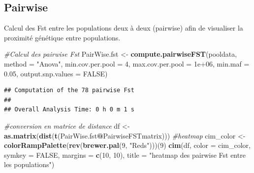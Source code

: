 \documentclass[
  openany]{book}
\newenvironment{Shaded}{\begin{snugshade}}{\end{snugshade}}
\newcommand{\AttributeTok}[1]{\textcolor[rgb]{0.13,0.29,0.53}{#1}}
\newcommand{\CommentTok}[1]{\textcolor[rgb]{0.56,0.35,0.01}{\textit{#1}}}
\newcommand{\ConstantTok}[1]{\textcolor[rgb]{0.56,0.35,0.01}{#1}}
\newcommand{\DecValTok}[1]{\textcolor[rgb]{0.00,0.00,0.81}{#1}}
\newcommand{\FloatTok}[1]{\textcolor[rgb]{0.00,0.00,0.81}{#1}}
\newcommand{\FunctionTok}[1]{\textcolor[rgb]{0.13,0.29,0.53}{\textbf{#1}}}
\newcommand{\NormalTok}[1]{#1}
\newcommand{\OtherTok}[1]{\textcolor[rgb]{0.56,0.35,0.01}{#1}}
\newcommand{\SpecialCharTok}[1]{\textcolor[rgb]{0.81,0.36,0.00}{\textbf{#1}}}
\newcommand{\StringTok}[1]{\textcolor[rgb]{0.31,0.60,0.02}{#1}}
\theoremstyle{definition}
\theoremstyle{definition}
\theoremstyle{definition}
\theoremstyle{definition}
\theoremstyle{remark}
\begin{document}
\hypertarget{pairwise}{%
\subsection*{Pairwise}\label{pairwise}}

Calcul des Fst entre les populations deux à deux (pairwise) afin de visualiser la proximité génétique entre populations.

\begin{Shaded}
\begin{Highlighting}[]
\CommentTok{\#Calcul des pairwise Fst }
\NormalTok{PairWise.fst }\OtherTok{\textless{}{-}} \FunctionTok{compute.pairwiseFST}\NormalTok{(pooldata, }\AttributeTok{method =} \StringTok{"Anova"}\NormalTok{, }\AttributeTok{min.cov.per.pool =} \DecValTok{4}\NormalTok{, }\AttributeTok{max.cov.per.pool =} \FloatTok{1e+06}\NormalTok{, }\AttributeTok{min.maf =} \FloatTok{0.05}\NormalTok{, }\AttributeTok{output.snp.values =} \ConstantTok{FALSE}\NormalTok{)}
\end{Highlighting}
\end{Shaded}

\begin{verbatim}
## Computation of the 78 pairwise Fst
## 
## Overall Analysis Time: 0 h 0 m 1 s
\end{verbatim}

\begin{Shaded}
\begin{Highlighting}[]
\CommentTok{\#conversion en matrice de distance}
\NormalTok{df }\OtherTok{\textless{}{-}} \FunctionTok{as.matrix}\NormalTok{(}\FunctionTok{dist}\NormalTok{(}\FunctionTok{t}\NormalTok{(PairWise.fst}\SpecialCharTok{@}\NormalTok{PairwiseFSTmatrix)))}
\CommentTok{\#heatmap}
\NormalTok{cim\_color }\OtherTok{\textless{}{-}} \FunctionTok{colorRampPalette}\NormalTok{(}\FunctionTok{rev}\NormalTok{(}\FunctionTok{brewer.pal}\NormalTok{(}\DecValTok{9}\NormalTok{, }\StringTok{"Reds"}\NormalTok{)))(}\DecValTok{9}\NormalTok{)}
\FunctionTok{cim}\NormalTok{(df, }\AttributeTok{color =}\NormalTok{ cim\_color, }\AttributeTok{symkey =} \ConstantTok{FALSE}\NormalTok{, }\AttributeTok{margins =} \FunctionTok{c}\NormalTok{(}\DecValTok{10}\NormalTok{, }\DecValTok{10}\NormalTok{),  }\AttributeTok{title =} \StringTok{"heatmap des pairwise Fst entre les populations"}\NormalTok{)}
\end{Highlighting}
\end{Shaded}
\end{document}
